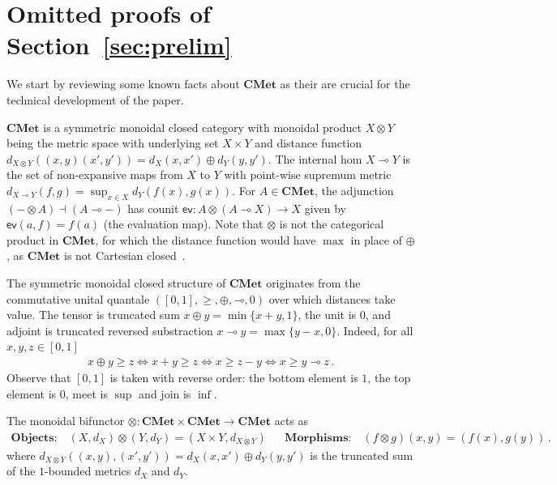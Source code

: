 \documentclass[a4paper,UKenglish,cleveref, autoref, thm-restate]{lipics-v2021}
\newcommand{\lol}{\mathbin{\multimap}}
\newcommand{\cat}[1]{\mathbf{#1}}
\newcommand{\CMet}{\cat{CMet}}
\newcommand{\mprod}{\otimes}
\newcommand{\mexp}{\lol}
\newcommand{\uinterval}{[0,1]}
\begin{document}



\newpage

\onecolumn
\appendix

\section{Omitted proofs of Section~\ref{sec:prelim}}

We start by reviewing some known facts about $\CMet$ as their are crucial for the technical development of the paper.


$\CMet$ is a symmetric monoidal closed category with monoidal product $X \mprod Y$ being the metric space with underlying set $X \times Y$ and 
distance function  $d_{X \mprod Y}((x,y)(x',y')) = d_X(x,x') \oplus d_Y(y,y')$.
The internal hom $X \mexp Y$ is the set of non-expansive maps from $X$ to $Y$ with point-wise supremum metric $d_{X \mexp Y}(f,g) = \sup_{x \in X} d_Y(f(x),g(x))$. For $A \in \CMet$, the adjunction $(- \mprod A) \dashv (A \mexp -)$ has counit $\mathsf{ev} \colon A \mprod (A \mexp X) \to X$ given by $\mathsf{ev}(a,f)=f(a)$ (the evaluation map).
%
Note that $\mprod$ is not the categorical product in $\CMet$, for which the distance function would have $\max$ in place of $\oplus$, as $\CMet$ is not Cartesian closed~\cite{Lawvere73}.


The symmetric monoidal closed structure of $\CMet$ originates from the commutative unital quantale $(\uinterval, \geq, \oplus, \lol, 0)$ over which distances take value. The tensor is truncated sum $x \oplus y = \min \{ x+y, 1\}$, the unit is $0$, and  adjoint is truncated reversed substraction $x \lol y = \max \{y - x, 0 \}$. Indeed,
for all $x,y,z \in \uinterval$
\begin{align*}
    x \oplus y \geq z 
    \iff x+y \geq z %
    \iff x \geq z - y %
    \iff x \geq y \lol z \,.
\end{align*}
Observe that $\uinterval$ is taken with reverse order: the bottom element is $1$, the top element is $0$, meet is $\sup$ and join is $\inf$.


The monoidal bifunctor $\mprod \colon \CMet \times \CMet \to \CMet$ acts as
\begin{align*}
\textbf{Objects:}\quad
(X,d_X) \mprod (Y, d_Y) = (X \times Y, d_{X \mprod Y})  &&
\textbf{Morphisms:}\quad
(f \mprod g)(x,y) = (f(x), g(y)) \,.
\end{align*}
where $d_{X \mprod Y}((x,y),(x',y')) = d_X(x,x') \oplus d_Y(y,y')$ is the truncated sum of the $1$-bounded metrics $d_X$ and $d_Y$.
\end{document}
